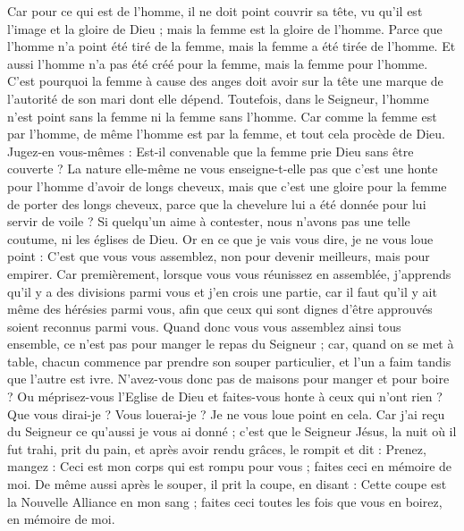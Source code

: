 \begin{multicols}{2}
Car pour ce qui est de l'homme, il ne doit point couvrir sa tête, vu qu'il est l'image et la gloire de Dieu ; mais la femme est la gloire de l'homme.
Parce que l'homme n'a point été tiré de la femme, mais la femme a été tirée de l'homme.
Et aussi l'homme n'a pas été créé pour la femme, mais la femme pour l'homme.
C'est pourquoi la femme à cause des anges doit avoir sur la tête une marque de l'autorité de son mari dont elle dépend.
Toutefois, dans le Seigneur, l'homme n'est point sans la femme ni la femme sans l'homme.
Car comme la femme est par l'homme, de même l'homme est par la femme, et tout cela procède de Dieu.
Jugez-en vous-mêmes : Est-il convenable que la femme prie Dieu sans être couverte ?
La nature elle-même ne vous enseigne-t-elle pas que c'est une honte pour l'homme d'avoir de longs cheveux,
mais que c'est une gloire pour la femme de porter des longs cheveux, parce que la chevelure lui a été donnée pour lui servir de voile ?
Si quelqu'un aime à contester, nous n'avons pas une telle coutume, ni les églises de Dieu.
Or en ce que je vais vous dire, je ne vous loue point : C'est que vous vous assemblez, non pour devenir meilleurs, mais pour empirer.
Car premièrement, lorsque vous vous réunissez en assemblée, j'apprends qu'il y a des divisions parmi vous et j'en crois une partie,
car il faut qu'il y ait même des hérésies parmi vous, afin que ceux qui sont dignes d'être approuvés soient reconnus parmi vous.
Quand donc vous vous assemblez ainsi tous ensemble, ce n'est pas pour manger le repas du Seigneur ;
car, quand on se met à table, chacun commence par prendre son souper particulier, et l'un a faim tandis que l'autre est ivre.
N'avez-vous donc pas de maisons pour manger et pour boire ? Ou méprisez-vous l'Eglise de Dieu et faites-vous honte à ceux qui n'ont rien ? Que vous dirai-je ? Vous louerai-je ? Je ne vous loue point en cela.
Car j'ai reçu du Seigneur ce qu'aussi je vous ai donné ; c'est que le Seigneur Jésus, la nuit où il fut trahi, prit du pain,
et après avoir rendu grâces, le rompit et dit : Prenez, mangez : Ceci est mon corps qui est rompu pour vous ; faites ceci en mémoire de moi.
De même aussi après le souper, il prit la coupe, en disant : Cette coupe est la Nouvelle Alliance en mon sang ; faites ceci toutes les fois que vous en boirez, en mémoire de moi.

\end{multicols}
